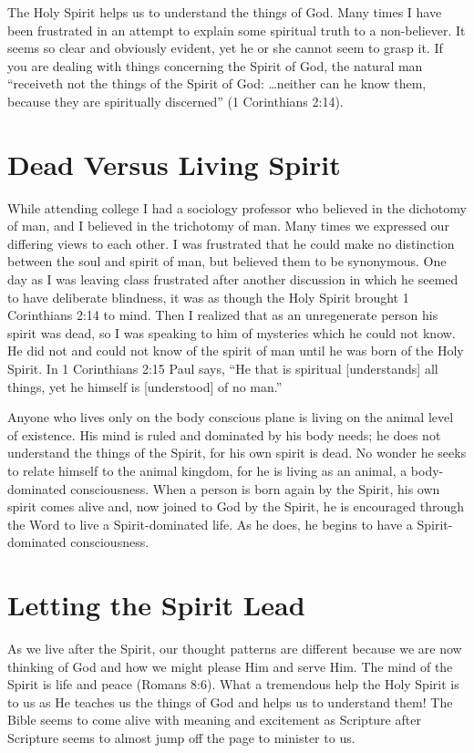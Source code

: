 The Holy Spirit helps us to understand the things of
God. Many times I have been frustrated in an attempt to
explain some spiritual truth to a non-believer. It seems so
clear and obviously evident, yet he or she cannot seem to
grasp it. If you are dealing with things concerning the Spirit
of God, the natural man “receiveth not the things of the
Spirit of God: …neither can he know them, because they are
spiritually discerned” (1 Corinthians 2:14).


\section*{Dead Versus Living Spirit}

While attending college I had a sociology professor who
believed in the dichotomy of man, and I believed in the trichotomy
of man. Many times we expressed our differing
views to each other. I was frustrated that he could make no
distinction between the soul and spirit of man, but believed
them to be synonymous. One day as I was leaving class
frustrated after another discussion in which he seemed to
have deliberate blindness, it was as though the Holy Spirit
brought 1 Corinthians 2:14 to mind. Then I realized that as
an unregenerate person his spirit was dead, so I was speaking
to him of mysteries which he could not know. He did
not and could not know of the spirit of man until he was
born of the Holy Spirit. In 1 Corinthians 2:15 Paul says, “He
that is spiritual [understands] all things, yet he himself is
[understood] of no man.”

Anyone who lives only on the body conscious plane is
living on the animal level of existence. His mind is ruled
and dominated by his body needs; he does not understand
the things of the Spirit, for his own spirit is dead. No
wonder he seeks to relate himself to the animal kingdom,
for he is living as an animal, a body-dominated consciousness.
When a person is born again by the Spirit, his own
spirit comes alive and, now joined to God by the Spirit, he
is encouraged through the Word to live a Spirit-dominated
life. As he does, he begins to have a Spirit-dominated consciousness.


\section*{Letting the Spirit Lead}

As we live after the Spirit, our thought patterns are different
because we are now thinking of God and how we
might please Him and serve Him. The mind of the Spirit is
life and peace (Romans 8:6). What a tremendous help the
Holy Spirit is to us as He teaches us the things of God and
helps us to understand them! The Bible seems to come alive
with meaning and excitement as Scripture after Scripture
seems to almost jump off the page to minister to us.

